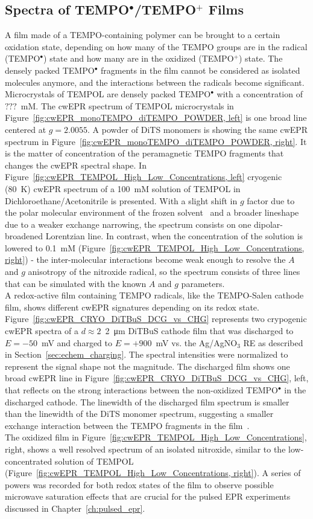 \subsection{Spectra of TEMPO$^{\bullet}$/TEMPO$^{+}$ Films}
A film made of a TEMPO-containing polymer can be brought to a certain oxidation state, depending on how many of the TEMPO groups are in the radical (TEMPO$^{\bullet}$) state and how many are in the oxidized (TEMPO$^{+}$) state. The densely packed TEMPO$^{\bullet}$ fragments in the film cannot be considered as isolated molecules anymore, and the interactions between the radicals become significant. Microcrystals of TEMPOL are densely packed TEMPO$^{\bullet}$ with a concentration of $???$~mM. The cwEPR spectrum of TEMPOL microcrystals in Figure~\ref{fig:cwEPR_monoTEMPO_diTEMPO_POWDER, left} is one broad line centered at $g=2.0055$. A powder of DiTS monomers is showing the same cwEPR spectrum in Figure~\ref{fig:cwEPR_monoTEMPO_diTEMPO_POWDER, right}. It is the matter of concentration of the peramagnetic TEMPO fragments that changes the cwEPR spectral shape. In Figure~\ref{fig:cwEPR_TEMPOL_High_Low_Concentrations, left} cryogenic (80~K) cwEPR spectrum of a 100~mM solution of TEMPOL in Dichloroethane/Acetonitrile is presented. With a slight shift in $g$ factor due to the polar molecular environment of the frozen solvent~\cite{Siavash} and a broader lineshape due to a weaker exchange narrowing, the spectrum consists on one dipolar-broadened Lorentzian line. In contrast, when the concentration of the solution is lowered to 0.1~mM (Figure~\ref{fig:cwEPR_TEMPOL_High_Low_Concentrations, right}) - the inter-molecular interactions become weak enough to resolve the $A$ and $g$ anisotropy of the nitroxide radical, so the spectrum consists of three lines that can be simulated with the known $A$ and $g$ parameters.\\
A redox-active film containing TEMPO radicals, like the TEMPO-Salen cathode film, shows different cwEPR signatures depending on its redox state. Figure~\ref{fig:cwEPR_CRYO_DiTBuS_DCG_vs_CHG} represents two crypogenic cwEPR spectra of a $d\approx2$~\SI{2}{\micro\meter} DiTBuS cathode film that was discharged to $E=-50$~mV and charged to $E=+900$~mV vs. the Ag/AgNO$_3$ RE as described in Section~\ref{sec:echem_charging}. The spectral intensities were normalized to represent the signal shape not the magnitude. The discharged film shows one broad cwEPR line in Figure~\ref{fig:cwEPR_CRYO_DiTBuS_DCG_vs_CHG}, left, that reflects on the strong interactions between the non-oxidized TEMPO$^{\bullet}$ in the discharged cathode. The linewidth of the discharged film spectrum is smaller than the linewidth of the DiTS monomer spectrum, suggesting a smaller exchange interaction between the TEMPO fragments in the film~\cite{Vereshchagin2020}.\\
The oxidized film in Figure~\ref{fig:cwEPR_TEMPOL_High_Low_Concentrations}, right, shows a well resolved spectrum of an isolated nitroxide, similar to the low-concentrated solution of TEMPOL (Figure~\ref{fig:cwEPR_TEMPOL_High_Low_Concentrations, right}). A series of powers was recorded for both redox states of the film to observe possible microwave saturation effects that are crucial for the pulsed EPR experiments discussed in Chapter~\ref{ch:pulsed_epr}.

